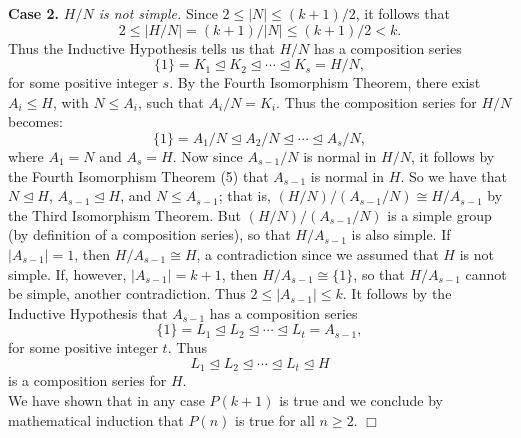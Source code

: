 \documentclass[9pt]{article}
\newcommand{\qed}{\hfill \ensuremath{\Box}}
\begin{document}
\begin{enumerate}
      \textbf{Case 2.} \textit{$H/N$ is not simple.} Since
      $2 \le |N| \le  (k+1)/2$, it follows that
      $$2 \le |H/N| = (k+1)/|N| \le (k+1)/2 < k.$$
      Thus the Inductive Hypothesis tells us that $H/N$ has a composition series
      $$\{1\} = K_1 \trianglelefteq K_2 \trianglelefteq \cdots \trianglelefteq
        K_s = H/N,$$
      for some positive integer $s$. By the Fourth Isomorphism Theorem, there
      exist $A_i \le H$, with $N \le A_i$, such that $A_i/N = K_i$. Thus the
      composition series for $H/N$ becomes:
      $$\{1\} = A_1/N \trianglelefteq A_2/N \trianglelefteq \cdots \trianglelefteq
        A_s/N,$$
      where $A_1 = N$ and $A_s = H$. Now since $A_{s-1}/N$ is normal in $H/N$,
      it follows by the Fourth Isomorphism Theorem (5) that $A_{s-1}$ is normal
      in $H$. So we have that $N \trianglelefteq H$,
      $A_{s-1} \trianglelefteq H$, and $N \le A_{s-1}$; that is,
      $(H/N)/(A_{s-1}/N) \cong H/A_{s-1}$ by the Third Isomorphism Theorem. But
      $(H/N)/(A_{s-1}/N)$ is a simple group (by definition of a composition
      series), so that $H/A_{s-1}$ is also simple. If $|A_{s-1}| = 1$, then
      $H/A_{s-1} \cong H$, a contradiction since we assumed that $H$ is not
      simple. If, however, $|A_{s-1}| = k + 1$, then $H/A_{s-1} \cong \{1\}$,
      so that $H/A_{s-1}$ cannot be simple, another contradiction. Thus
      $2 \le |A_{s-1}| \le k$. It follows by the Inductive Hypothesis that
      $A_{s-1}$ has a composition series
      $$\{1\} = L_1 \trianglelefteq L_2 \trianglelefteq \cdots \trianglelefteq
        L_t = A_{s-1},$$
      for some positive integer $t$. Thus
      $$L_1 \trianglelefteq L_2 \trianglelefteq \cdots \trianglelefteq
        L_t \trianglelefteq H$$
      is a composition series for $H$. \\
      
      We have shown that in any case $P(k+1)$ is true and we conclude by
      mathematical induction that $P(n)$ is true for all $n \ge 2$. \qed
\end{enumerate}
\end{document}
